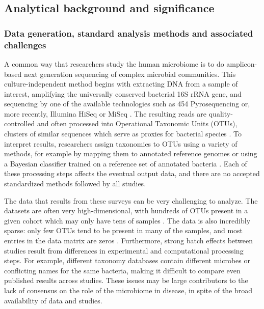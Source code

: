 \documentclass[12pt]{article}
\begin{document}
\subsection{Analytical background and significance}

\subsubsection{Data generation, standard analysis methods and associated challenges} 
A common way that researchers study the human microbiome is to do 
amplicon-based next generation sequencing of complex microbial 
communities. This culture-independent method begins with extracting
DNA from a sample of interest, amplifying the universally conserved
bacterial 16S rRNA gene, and sequencing by one of the available technologies such as 454 
Pyrosequencing or, more recently, Illumina HiSeq or MiSeq \cite{knights-supervised-2010, sze-signal-2016}. 
The resulting reads are quality-controlled and often processed into Operational Taxonomic Units (OTUs), 
clusters of similar sequences which serve as proxies for bacterial 
species \cite{knights-supervised-2010}. To interpret results, researchers assign taxonomies to 
OTUs using a variety of methods, for example by mapping them to 
annotated reference genomes or using a Bayesian classifier trained on 
a reference set of annotated bacteria \cite{wang-rdp-2007, mcdonald-gg-2011}. Each of 
these processing steps affects the eventual output data, and there
are no accepted standardized methods followed by all studies.

The data that results from these surveys can be very challenging to analyze.
The datasets are often very high-dimensional, with hundreds 
of OTUs present in a given cohort which may only have tens of samples \cite{sze-signal-2016}. 
The data is also incredibly sparse: only few OTUs tend to be 
present in many of the samples, and most entries in the data matrix 
are zeros \cite{knights-biomarkers-2011}. 
Furthermore, strong batch effects between studies result from 
differences in experimental and computational processing steps.
For example, different taxonomy databases contain different 
microbes or conflicting names for the same bacteria, making it 
difficult to compare even published results across studies.  
These issues may be large contributors to the lack of consensus on the 
role of the microbiome in disease, in spite of the broad availability of data and studies.
\end{document}
